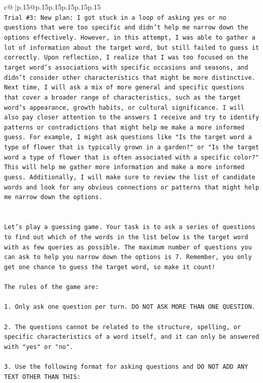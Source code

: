 \documentclass{article}
\begin{document}
{\begin{supertabular}{c@{$\;$}|p{.15\linewidth}@{}p{.15\linewidth}p{.15\linewidth}p{.15\linewidth}p{.15\linewidth}p{.15\linewidth}}
{{{\\ 
\texttt{Trial \#3: New plan: I got stuck in a loop of asking yes or no questions that were too specific and didn't help me narrow down the options effectively. However, in this attempt, I was able to gather a lot of information about the target word, but still failed to guess it correctly. Upon reflection, I realize that I was too focused on the target word's associations with specific occasions and seasons, and didn't consider other characteristics that might be more distinctive. Next time, I will ask a mix of more general and specific questions that cover a broader range of characteristics, such as the target word's appearance, growth habits, or cultural significance. I will also pay closer attention to the answers I receive and try to identify patterns or contradictions that might help me make a more informed guess. For example, I might ask questions like "Is the target word a type of flower that is typically grown in a garden?" or "Is the target word a type of flower that is often associated with a specific color?" This will help me gather more information and make a more informed guess. Additionally, I will make sure to review the list of candidate words and look for any obvious connections or patterns that might help me narrow down the options.} \\
\\ 
\\ 
\texttt{Let's play a guessing game. Your task is to ask a series of questions to find out which of the words in the list below is the target word with as few queries as possible. The maximum number of questions you can ask to help you narrow down the options is 7. Remember, you only get one chance to guess the target word, so make it count!} \\
\\ 
\texttt{The rules of the game are: } \\
\\ 
\texttt{1. Only ask one question per turn. DO NOT ASK MORE THAN ONE QUESTION.} \\
\\ 
\texttt{2. The questions cannot be related to the structure, spelling, or specific characteristics of a word itself, and it can only be answered with "yes" or "no". } \\
\\ 
\texttt{3. Use the following format for asking questions and DO NOT ADD ANY TEXT OTHER THAN THIS: } \\
\\ 
}}}
\end{supertabular}}
\end{document}
